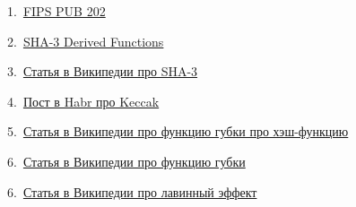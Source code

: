 \documentclass[a4paper,12pt]{article}
\theoremstyle{plain} %
\theoremstyle{definition} %
\theoremstyle{remark} %
\begin{document}
	1.\ \href{https://dx.doi.org/10.6028%2Fnist.fips.202}{FIPS PUB 202}

	
	2.\ \href{https://doi.org/10.6028/NIST.SP.800-185}{SHA-3 Derived Functions}
	
	3.\ \href{https://ru.wikipedia.org/wiki/SHA-3}{Статья в Википедии про SHA-3}
	
	4.\ \href{https://habr.com/ru/post/534082/}{Пост в Habr про Keccak}
	
	5.\ \href{https://ru.wikipedia.org/wiki/Хеш-функция}{Статья в Википедии про функцию губки про хэш-функцию}
	
	6.\ \href{https://ru.wikipedia.org/wiki/Функция_губки}{Статья в Википедии про функцию губки}
	
	6.\ \href{https://ru.wikipedia.org/wiki/Лавинный_эффект}{Статья в Википедии про лавинный эффект}
	
	
	
	

	

	

	
	
	
	
	
\end{document}
